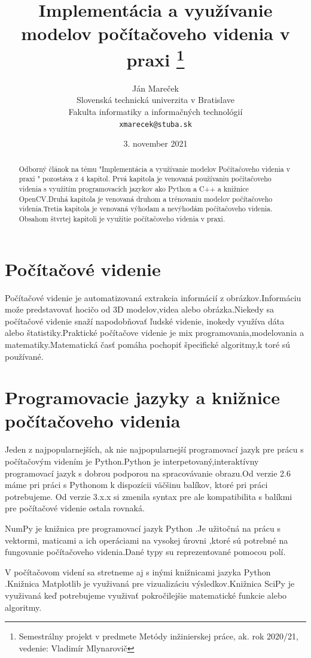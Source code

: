 \documentclass[10pt,twoside,slovak,a4paper]{coursepaper}
\title{Implementácia a využívanie modelov počítačoveho videnia v praxi \thanks{Semestrálny projekt v predmete Metódy inžinierskej práce, ak. rok 2020/21, vedenie: Vladimír Mlynarovič}} %
\author{Ján Mareček\\[2pt]
	{\small Slovenská technická univerzita v Bratislave}\\
	{\small Fakulta informatiky a informačných technológií}\\
	{\small \texttt{xmarecek@stuba.sk}}
	}
\date{\small 3. november 2021} %
\begin{document}
\maketitle


\begin{abstract}
Odborný článok na tému "Implementácia a využívanie modelov Počítačoveho videnia v praxi " pozostáva z 4 kapitol. Prvá kapitola je venovaná používaniu počítačoveho videnia s využitím programovacích jazykov ako Python a C++ a knižnice OpenCV.Druhá kapitola je venovaná druhom a trénovaniu modelov počítačoveho videnia.Tretia kapitola je venovaná výhodam a nevýhodám počítačoveho videnia. Obsahom štvrtej kapitoli je využitie počítačoveho videnia v praxi. 
\end{abstract}

\section{Počítačové videnie}
Počítačové videnie je automatizovaná extrakcia informácií z obrázkov.Informáciu može predstavovať hocičo od 3D modelov,videa alebo obrázka.Niekedy sa počítačové videnie snaží napodobňovať ľudské videnie, inokedy využíva dáta alebo štatistiky.Praktické počítačove videnie je mix programovania,modelovania a matematiky.Matematická časť pomáha pochopiť špecifické algoritmy,k toré sú používané.

\section{Programovacie jazyky a knižnice počítačoveho videnia}


Jeden z najpopularnejších, ak nie najpopularnejší programovací jazyk pre prácu s počítačovým videním je Python.Python je interpetovaný,interaktívny programovací jazyk s dobrou podporou na spracovávanie obrazu.Od verzie 2.6 máme pri práci s Pythonom k dispozícii väčšinu balíkov, ktoré pri práci potrebujeme. Od verzie 3.x.x si zmenila syntax pre ale kompatibilita s balíkmi pre počítačové videnie ostala rovnaká.\cite{Python-CV}


NumPy je knižnica pre programovací jazyk Python .Je užitočná na prácu s vektormi,  maticami a ich operáciami na vysokej úrovni ,ktoré sú potrebné na fungovanie počítačoveho videnia.Dané typy su reprezentované pomocou polí.


V počítačovom videní sa stretneme aj s inými knižnicami jazyka Python .Knižnica Matplotlib je využivaná pre vizualizáciu  výsledkov.Knižnica SciPy je využivaná keď potrebujeme využivať pokročilejšie matematické funkcie alebo algoritmy.\cite{Python-CV}
\end{document}
